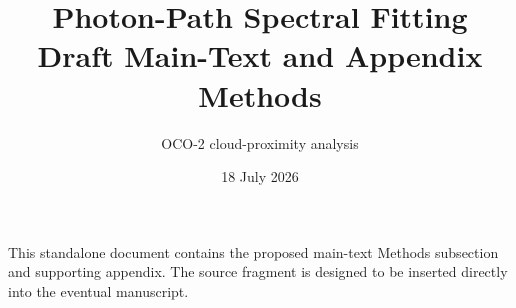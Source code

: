 \documentclass[11pt]{article}
\title{Photon-Path Spectral Fitting\\
\large Draft Main-Text and Appendix Methods}
\author{OCO-2 cloud-proximity analysis}
\date{18 July 2026}
\begin{document}
\maketitle

\noindent
This standalone document contains the proposed main-text Methods subsection and
supporting appendix.  The source fragment is designed to be inserted directly
into the eventual manuscript.

\tableofcontents
\clearpage





\end{document}
